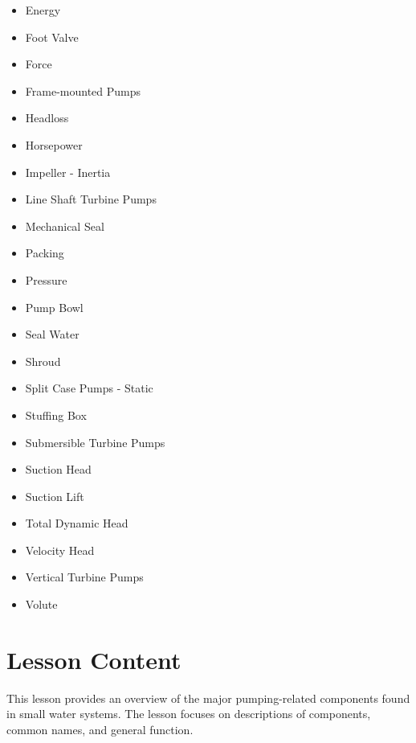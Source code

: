 \documentclass[10pt]{article}
\begin{document}
\begin{itemize}
  \item Energy

  \item Foot Valve

  \item Force

  \item Frame-mounted Pumps

  \item Headloss

  \item Horsepower

  \item Impeller - Inertia

  \item Line Shaft Turbine Pumps

  \item Mechanical Seal

  \item Packing

  \item Pressure

  \item Pump Bowl

  \item Seal Water

  \item Shroud

  \item Split Case Pumps - Static

  \item Stuffing Box

  \item Submersible Turbine Pumps

  \item Suction Head

  \item Suction Lift

  \item Total Dynamic Head

  \item Velocity Head

  \item Vertical Turbine Pumps

  \item Volute

\end{itemize}
\section{Lesson Content}
This lesson provides an overview of the major pumping-related components found in small water systems. The lesson focuses on descriptions of components, common names, and general function.
\end{document}
